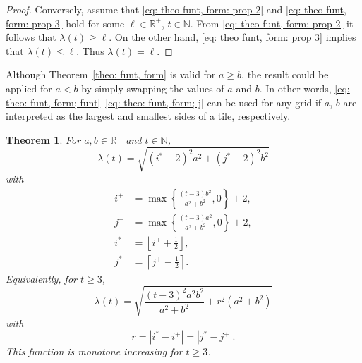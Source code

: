 \documentclass[12pt, a4paper]{article}
\newcommand{\funl}{\lambda} %
\newcommand{\len}{\ell} %
\newcommand{\tiles}{t} %
\newcommand{\isolr}{i^+}
\newcommand{\jsolr}{j^+}
\newcommand{\isoli}{i^\ast}
\newcommand{\jsoli}{j^\ast}
\newcommand{\roundterm}{r}
\newtheorem{theorem}{Theorem}%
\begin{document}
\begin{proof}
Conversely, assume that \eqref{eq: theo funt, form: prop 2} and \eqref{eq: theo funt, form: prop 3} hold for some $\len \in \mathbb R^+$, $\tiles \in \mathbb N$. From \eqref{eq: theo funt, form: prop 2} it follows that  $\funl(\tiles) \geq \len$. On the other hand, \eqref{eq: theo funt, form: prop 3} implies that $\funl(\tiles) \leq \len$. Thus $\funl(\tiles)=\len$.
\end{proof}

Although Theorem~\ref{theo: funt, form} is valid for $a \geq b$, the result could be applied for $a < b$ by simply swapping the values of $a$ and $b$. In other words, \eqref{eq: theo: funt, form; funt}--\eqref{eq: theo: funt, form; j}
can be used for any grid if $a$, $b$ are interpreted as the largest and smallest sides of a tile, respectively.

\begin{theorem}
\label{theo: funl, form}
For $a, b \in \mathbb R^+$ and $\tiles \in \mathbb N$,
\begin{equation}
\label{eq: theo: funl, form; funl}
\funl(\tiles) = \sqrt{(\isoli-2)^2 a^2 + (\jsoli-2)^2 b^2}
\end{equation}
with
\begin{align}
\label{eq: theo: funl, form; isolr}
\isolr &= \max\left\{ \frac{(\tiles-3) b^2}{a^2+b^2}, 0 \right\} + 2, \\
\label{eq: theo: funl, form; jsolr}
\jsolr &= \max\left\{ \frac{(\tiles-3) a^2}{a^2+b^2}, 0 \right\} + 2, \\
\label{eq: theo: funl, form; isoli}
\isoli &= \left\lfloor \isolr + \frac 1 2 \right\rfloor, \\
\label{eq: theo: funl, form; jsoli}
\jsoli &= \left\lceil \jsolr - \frac 1 2 \right\rceil.
\end{align}
Equivalently, for $\tiles \geq 3$,
\begin{equation}
\label{eq: theo: funl, form; funl 2}
\funl(\tiles) = \sqrt{\frac{(t-3)^2 a^2 b^2}{a^2+b^2} + \roundterm^2(a^2+b^2)}
\end{equation}
with
\begin{equation}
\label{eq: roundterm}
\roundterm = |\isoli - \isolr| = |\jsoli - \jsolr|.
\end{equation}
This function is monotone increasing for $\tiles \geq 3$.
\end{theorem}
\end{document}
